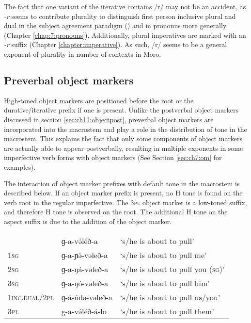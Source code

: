 The fact that one variant of the iterative contains /r/ may not be an accident, as \textit{-r} seems to contribute plurality to distinguish first person inclusive plural and dual in the subject agreement paradigm () and in pronouns more generally (Chapter \ref{chap:7:pronouns}). Additionally, plural imperatives are marked with an \textit{-r} suffix (Chapter \ref{chapter:imperative}). As such, /r/ seems to be a general exponent of plurality in number of contexts in Moro.

\subsection{Preverbal object markers}\label{sec:ch11:objectpre}

High-toned object markers are positioned before the root or the durative/iterative prefix if one is present. Unlike the postverbal object markers discussed in section \ref{sec:ch11:objectpost}, preverbal object markers are incorporated into the macrostem and play a role in the distribution of tone in the macrostem. This explains the fact that only some components of object markers are actually able to appear postverbally, resulting in multiple exponents in some imperfective verb forms with object markers (See Section \ref{sec:ch7:om} for examples).  

The interaction of object marker prefixes with default tone in the macrostem is described below. If an object marker prefix is present, no H tone is found on the verb root in the regular imperfective. The \textsc{3pl} object marker is a low-toned suffix, and therefore H tone is observed on the root. The additional H tone on the aspect suffix is due to the addition of the object marker. 

\ea 
\begin{tabular}[t]{lll}
				&	ɡ-a-və́léð-a		&	‘s/he is about to pull’\\
\textsc{1sg}	&	ɡ-a-ɲə́-vəleð-a	&	‘s/he is about to pull me’\\
\textsc{2sg}	&	ɡ-a-ŋá-vəleð-a	&	‘s/he is about to pull you (\textsc{sg})’\\
\textsc{3sg}	&	ɡ-a-ŋó-vəleð-a	&	‘s/he is about to pull him’\\
\textsc{1inc.dual}/\textsc{2pl}	&	ɡ-á-ńdə-vəleð-a	&	‘s/he is about to pull us/you’\\
\textsc{3pl}	&	g-a-və́léð-á-lo	&	‘s/he is about to pull them’\\ 
\end{tabular}	
\z 

